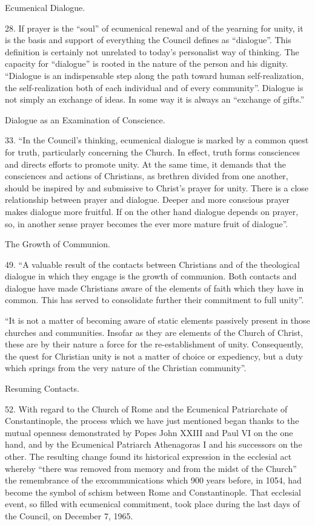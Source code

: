 \documentclass[oneside]{book}
\begin{document}
Ecumenical Dialogue.

28.  If prayer is the ``soul'' of ecumenical renewal and of the yearning for
unity, it is the basis and support of everything the Council defines as
``dialogue''. This definition is certainly not unrelated to today's personalist
way of thinking. The capacity for ``dialogue'' is rooted in the nature of the
person and his dignity.  ``Dialogue is an indispensable step along the path
toward human self-realization, the self-realization both of each individual and
of every community''. Dialogue is not simply an exchange of ideas. In some way
it is always an ``exchange of gifts.''

Dialogue as an Examination of Conscience.

33. ``In the Council's thinking, ecumenical dialogue is marked by a common quest
for truth, particularly concerning the Church. In effect, truth forms
consciences and directs efforts to promote unity. At the same time, it demands
that the consciences and actions of Christians, as brethren divided from one
another, should be inspired by and submissive to Christ's prayer for
unity. There is a close relationship between prayer and dialogue. Deeper and
more conscious prayer makes dialogue more fruitful. If on the other hand
dialogue depends on prayer, so, in another sense prayer becomes the ever more
mature fruit of dialogue''.

The Growth of Communion.

49. ``A valuable result of the contacts between Christians and of the
theological dialogue in which they engage is the growth of communion. Both
contacts and dialogue have made Christians aware of the elements of faith which
they have in common. This has served to consolidate further their commitment to
full unity''.

``It is not a matter of becoming aware of static elements passively present in
those churches and communities. Insofar as they are elements of the Church of
Christ, these are by their nature a force for the re-establishment of
unity. Consequently, the quest for Christian unity is not a matter of choice or
expediency, but a duty which springs from the very nature of the Christian community''.

Resuming Contacts.

52.  With regard to the Church of Rome and the Ecumenical Patriarchate of
Constantinople, the process which we have just mentioned began thanks to the
mutual openness demonstrated by Popes John XXIII and Paul VI on the one hand,
and by the Ecumenical Patriarch Athenagoras I and his successors on the
other. The resulting change found its historical expression in the ecclesial act
whereby ``there was removed from memory and from the midst of the Church'' the
remembrance of the excommunications which 900 years before, in 1054, had become
the symbol of schism between Rome and Constantinople. That ecclesial event, so
filled with ecumenical commitment, took place during the last days of the
Council, on December 7, 1965.
\end{document}
